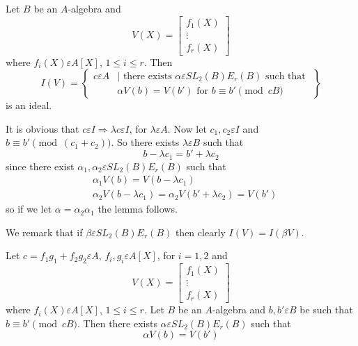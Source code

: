 \begin{lem}\label{c2:lem2.9}
Let $B$ be an $A$-algebra and 
$$
V(X)=
\begin{bmatrix}
f_1(X)\\
\vdots\\
f_r(X)
\end{bmatrix}
$$
where $f_i(X)\varepsilon A[X]$, $1\leq i\leq r$. Then 
$$
I(V)=
\left\{
\begin{aligned}
c\varepsilon A &\mid \text{ there exists } \alpha \varepsilon
SL_2(B)E_r(B) \text{ such that }\\
&\alpha V(b)=V(b') \text{ for } b\equiv b'\pmod{cB}
\end{aligned}\right\}
$$
is an ideal.
\end{lem}

\begin{Proof}
It is obvious that $c\varepsilon I\Rightarrow \lambda c \varepsilon
I$, for $\lambda \varepsilon A$. Now let $c_1,c_2\varepsilon I$ and
$b\equiv b'\pmod{(c_1+c_2)}$. So there exists $\lambda \varepsilon B$
such that 
$$
b-\lambda c_1=b'+\lambda c_2
$$
since there exist $\alpha_1,\alpha_2\varepsilon SL_2(B)E_r(B)$ such
that 
\begin{align*}
&\alpha_1V(b)=V(b-\lambda c_1)\\
&\alpha_2V(b-\lambda c_1)=\alpha_2 V(b'+\lambda c_2)=V(b')
\end{align*}
so if we let $\alpha=\alpha_2\alpha_1$ the lemma follows.

We remark that if $\beta \varepsilon SL_2(B)E_r(B)$ then clearly
$I(V)=I(\beta V)$.
\end{Proof}


\begin{lem}\label{c2:lem2.10}
Let $c=f_1g_1+f_2g_2\varepsilon A$, $f_i,g_i \varepsilon A[X]$, for
$i=1,2$ and 
$$
V(X)=
\begin{bmatrix}
f_1(X)\\
\vdots\\
f_r(X)
\end{bmatrix}
$$
where $f_i(X)\varepsilon A[X]$, $1\leq i\leq r$. Let $B$ be an
$A$-algebra and $b,b' \varepsilon B$ be such that $b\equiv
b'\pmod{cB}$. Then there exists $\alpha \varepsilon SL_2(B)E_r(B)$
such that
$$
\alpha V(b)=V(b')
$$
\end{lem}

